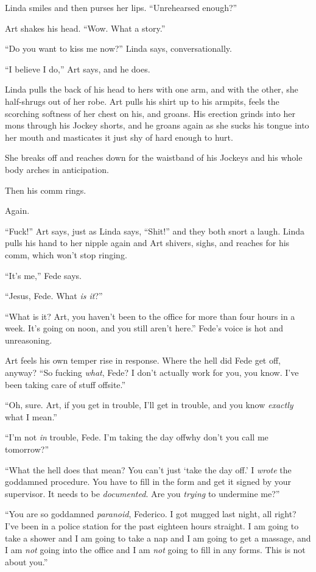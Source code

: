 Linda smiles and then purses her lips. “Unrehearsed enough?”

Art shakes his head. “Wow. What a story.”

“Do you want to kiss me now?” Linda says, conversationally.

“I believe I do,” Art says, and he does.

Linda pulls the back of his head to hers with one arm, and with the
other, she half-shrugs out of her robe. Art pulls his shirt up to
his armpits, feels the scorching softness of her chest on his, and
groans. His erection grinds into her mons through his Jockey
shorts, and he groans again as she sucks his tongue into her mouth
and masticates it just shy of hard enough to hurt.

She breaks off and reaches down for the waistband of his Jockeys
and his whole body arches in anticipation.

Then his comm rings.

Again.

“Fuck!” Art says, just as Linda says, “Shit!” and they both snort a
laugh. Linda pulls his hand to her nipple again and Art shivers,
sighs, and reaches for his comm, which won’t stop ringing.

“It’s me,” Fede says.

“Jesus, Fede. What \emph{is it}?”

“What is it? Art, you haven’t been to the office for more than four
hours in a week. It’s going on noon, and you still aren’t here.”
Fede’s voice is hot and unreasoning.

Art feels his own temper rise in response. Where the hell did Fede
get off, anyway? “So fucking \emph{what}, Fede? I don’t actually
work for you, you know. I’ve been taking care of stuff offsite.”

“Oh, sure. Art, if you get in trouble, I’ll get in trouble, and you
know \emph{exactly} what I mean.”

“I’m not \emph{in} trouble, Fede. I’m taking the day off{\dash}why don’t
you call me tomorrow?”

“What the hell does that mean? You can’t just ‘take the day off.’ I
\emph{wrote} the goddamned procedure. You have to fill in the form
and get it signed by your supervisor. It needs to be
\emph{documented}. Are you \emph{trying} to undermine me?”

“You are so goddamned \emph{paranoid}, Federico. I got mugged last
night, all right? I’ve been in a police station for the past
eighteen hours straight. I am going to take a shower and I am going
to take a nap and I am going to get a massage, and I am \emph{not}
going into the office and I am \emph{not} going to fill in any
forms. This is not about you.”

